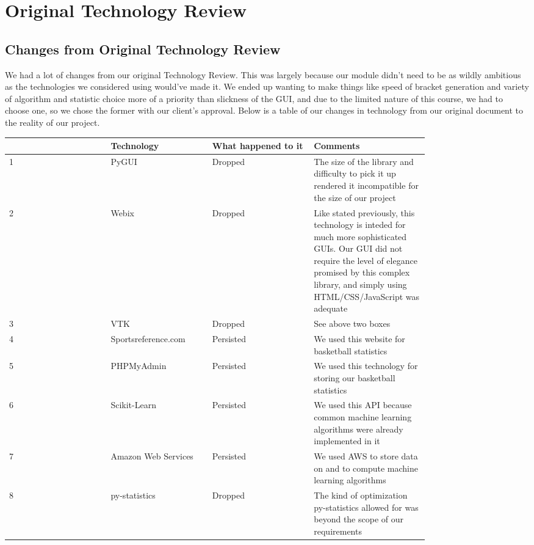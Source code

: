 \documentclass[onecolumn, draftclsnofoot,10pt, compsoc]{IEEEtran}
\begin{document}
\section{Original Technology Review}


\subsection{Changes from Original Technology Review}
We had a lot of changes from our original Technology Review. This was largely because our module didn't need to be as wildly ambitious as the technologies we considered using would've made it. We ended up wanting to make things like speed of bracket generation and variety of algorithm and statistic choice more of a priority than slickness of the GUI, and due to the limited nature of this course, we had to choose one, so we chose the former with our client's approval. Below is a table of our changes in technology from our original document to the reality of our project.

\begin{center}
	\begin{tabular}{ || p{0.2\linewidth} || p{0.2\linewidth} || p{0.2\linewidth}  || p{0.2\linewidth} ||}
	\hline
 	  & Technology & What happened to it & Comments \\ \hline
	1 & PyGUI & Dropped & The size of the library and difficulty to pick it up rendered it incompatible for the size of our project \\ \hline
	2 & Webix & Dropped & Like stated previously, this technology is inteded for much more sophisticated GUIs. Our GUI did not require the level of elegance promised by this complex library, and simply using HTML/CSS/JavaScript was adequate \\ \hline
	3 & VTK & Dropped & See above two boxes \\ \hline
	4 & Sportsreference.com & Persisted & We used this website for basketball statistics \\ \hline
	5 & PHPMyAdmin & Persisted & We used this technology for storing our basketball statistics \\ \hline
	6 & Scikit-Learn & Persisted & We used this API because common machine learning algorithms were already implemented in it \\ \hline
	7 & Amazon Web Services & Persisted & We used AWS to store data on and to compute machine learning algorithms \\ \hline
	8 & py-statistics & Dropped & The kind of optimization py-statistics allowed for was beyond the scope of our requirements \\
	\hline
	\end{tabular}
\end{center}
\end{document}
